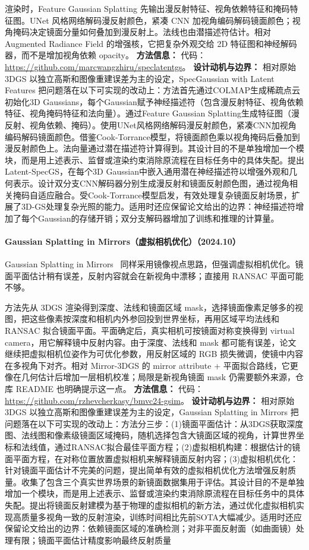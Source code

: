 渲染时，Feature Gaussian Splatting 先输出漫反射特征、视角依赖特征和掩码特征图。UNet 风格网络解码漫反射颜色，紧凑 CNN 加视角编码解码镜面颜色；视角掩码决定镜面分量如何叠加到漫反射上。法线也由潜描述符估计。相对 Augmented Radiance Field 的增强核，它把复杂外观交给 2D 特征图和神经解码器，而不是增加视角依赖 opacity。
\textbf{方法信息：} 代码：\url{https://github.com/marcwangzhiru/speclatentgs}。
\textbf{设计动机与边界：} 相对原始 3DGS 以独立高斯和图像重建误差为主的设定，SpecGaussian with Latent Features 把问题落在以下可实现的改动上：方法首先通过COLMAP生成稀疏点云初始化3D Gaussians，每个Gaussian赋予神经描述符（包含漫反射特征、视角依赖特征、视角掩码特征和法向量）。通过Feature Gaussian Splatting生成特征图（漫反射、视角依赖、掩码）。使用UNet风格网络解码漫反射颜色，紧凑CNN加视角编码解码镜面颜色。借鉴Cook-Torrance模型，将镜面颜色乘以视角掩码后叠加到漫反射颜色上。法向量通过潜在描述符计算得到。其设计目的不是单独增加一个模块，而是用上述表示、监督或渲染约束消除原流程在目标任务中的具体失配。提出Latent-SpecGS，在每个3D Gaussian中嵌入通用潜在神经描述符以增强外观和几何表示。设计双分支CNN解码器分别生成漫反射和镜面反射颜色图，通过视角相关掩码自适应融合。受Cook-Torrance模型启发，有效处理复杂镜面反射场景，扩展了3D-GS处理复杂光照的能力。适用时还应保留论文给出的边界：神经描述符增加了每个Gaussian的存储开销；双分支解码器增加了训练和推理的计算量。
\paragraph{Gaussian Splatting in Mirrors（虚拟相机优化）（2024.10）}
Gaussian Splatting in Mirrors~\cite{2410_01614} 同样采用镜像视点思路，但强调虚拟相机优化。镜面平面估计稍有误差，反射内容就会在新视角中漂移；直接用 RANSAC 平面可能不够。

方法先从 3DGS 渲染得到深度、法线和镜面区域 mask，选择镜面像素足够多的视图，把这些像素按深度和相机内外参回投到世界坐标，再用区域平均法线和 RANSAC 拟合镜面平面。平面确定后，真实相机可按镜面对称变换得到 virtual camera，用它解释镜中反射内容。由于深度、法线和 mask 都可能有误差，论文继续把虚拟相机位姿作为可优化参数，用反射区域的 RGB 损失微调，使镜中内容在多视角下对齐。相对 Mirror-3DGS 的 mirror attribute + 平面拟合路线，它更像在几何估计后增加一层相机校准；局限是新视角镜面 mask 仍需要额外来源，仓库 README 也明确提示这一点。
\textbf{方法信息：} 代码：\url{https://github.com/rzhevcherkasy/bmvc24-gsim}。
\textbf{设计动机与边界：} 相对原始 3DGS 以独立高斯和图像重建误差为主的设定，Gaussian Splatting in Mirrors 把问题落在以下可实现的改动上：方法分三步：(1)镜面平面估计：从3DGS获取深度图、法线图和像素级镜面区域掩码，随机选择包含大镜面区域的视角，计算世界坐标和法线值，通过RANSAC拟合最佳平面方程；(2)虚拟相机构建：根据估计的镜面平面方程，在对称位置放置虚拟相机来解释镜面反射内容；(3)虚拟相机优化：针对镜面平面估计不完美的问题，提出简单有效的虚拟相机优化方法增强反射质量。收集了包含三个真实世界场景的新镜面数据集用于评估。其设计目的不是单独增加一个模块，而是用上述表示、监督或渲染约束消除原流程在目标任务中的具体失配。提出将镜面反射建模为基于物理的虚拟相机的新方法，通过优化虚拟相机实现高质量多视角一致的反射渲染，训练时间相比先前SOTA大幅减少。适用时还应保留论文给出的边界：依赖镜面区域的准确检测；对非平面反射面（如曲面镜）处理有限；镜面平面估计精度影响最终反射质量
